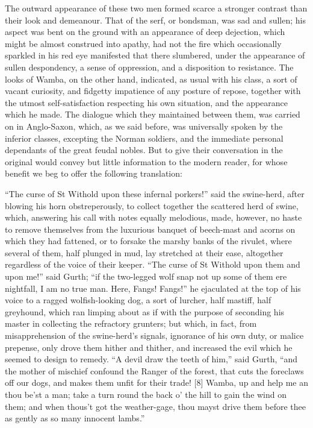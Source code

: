 The outward appearance of these two men formed scarce a stronger
contrast than their look and demeanour. That of the serf, or bondsman,
was sad and sullen; his aspect was bent on the ground with an appearance
of deep dejection, which might be almost construed into apathy, had not
the fire which occasionally sparkled in his red eye manifested that
there slumbered, under the appearance of sullen despondency, a sense of
oppression, and a disposition to resistance. The looks of Wamba, on the
other hand, indicated, as usual with his class, a sort of vacant
curiosity, and fidgetty impatience of any posture of repose, together
with the utmost self-satisfaction respecting his own situation, and the
appearance which he made. The dialogue which they maintained between
them, was carried on in Anglo-Saxon, which, as we said before, was
universally spoken by the inferior classes, excepting the Norman
soldiers, and the immediate personal dependants of the great feudal
nobles. But to give their conversation in the original would convey but
little information to the modern reader, for whose benefit we beg to
offer the following translation:

``The curse of St Withold upon these infernal porkers!'' said the
swine-herd, after blowing his horn obstreperously, to collect together
the scattered herd of swine, which, answering his call with notes
equally melodious, made, however, no haste to remove themselves from the
luxurious banquet of beech-mast and acorns on which they had fattened,
or to forsake the marshy banks of the rivulet, where several of them,
half plunged in mud, lay stretched at their ease, altogether regardless
of the voice of their keeper. ``The curse of St Withold upon them and
upon me!'' said Gurth; ``if the two-legged wolf snap not up some of them
ere nightfall, I am no true man. Here, Fangs! Fangs!'' he ejaculated at
the top of his voice to a ragged wolfish-looking dog, a sort of lurcher,
half mastiff, half greyhound, which ran limping about as if with the
purpose of seconding his master in collecting the refractory grunters;
but which, in fact, from misapprehension of the swine-herd's signals,
ignorance of his own duty, or malice prepense, only drove them hither
and thither, and increased the evil which he seemed to design to remedy.
``A devil draw the teeth of him,'' said Gurth, ``and the mother of
mischief confound the Ranger of the forest, that cuts the foreclaws off
our dogs, and makes them unfit for their trade! {[}8{]} Wamba, up and
help me an thou be'st a man; take a turn round the back o' the hill to
gain the wind on them; and when thous't got the weather-gage, thou mayst
drive them before thee as gently as so many innocent lambs.''

